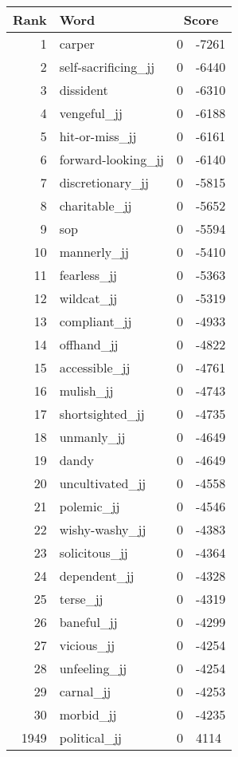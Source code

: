 \begin{longtable}[!htbp]{| rlr@{.}l |}
    \hline
    \textbf{Rank} & \textbf{Word} & \multicolumn{2}{c|}{\textbf{Score}} \\
    \hline
    \endhead
    1 & carper & 0 & -7261 \\
    2 & self-sacrificing\_jj & 0 & -6440 \\
    3 & dissident & 0 & -6310 \\
    4 & vengeful\_jj & 0 & -6188 \\
    5 & hit-or-miss\_jj & 0 & -6161 \\
    6 & forward-looking\_jj & 0 & -6140 \\
    7 & discretionary\_jj & 0 & -5815 \\
    8 & charitable\_jj & 0 & -5652 \\
    9 & sop & 0 & -5594 \\
    10 & mannerly\_jj & 0 & -5410 \\
    11 & fearless\_jj & 0 & -5363 \\
    12 & wildcat\_jj & 0 & -5319 \\
    13 & compliant\_jj & 0 & -4933 \\
    14 & offhand\_jj & 0 & -4822 \\
    15 & accessible\_jj & 0 & -4761 \\
    16 & mulish\_jj & 0 & -4743 \\
    17 & shortsighted\_jj & 0 & -4735 \\
    18 & unmanly\_jj & 0 & -4649 \\
    19 & dandy & 0 & -4649 \\
    20 & uncultivated\_jj & 0 & -4558 \\
    21 & polemic\_jj & 0 & -4546 \\
    22 & wishy-washy\_jj & 0 & -4383 \\
    23 & solicitous\_jj & 0 & -4364 \\
    24 & dependent\_jj & 0 & -4328 \\
    25 & terse\_jj & 0 & -4319 \\
    26 & baneful\_jj & 0 & -4299 \\
    27 & vicious\_jj & 0 & -4254 \\
    28 & unfeeling\_jj & 0 & -4254 \\
    29 & carnal\_jj & 0 & -4253 \\
    30 & morbid\_jj & 0 & -4235 \\
    1949 & political\_jj & 0 & 4114 \\

\end{longtable}
